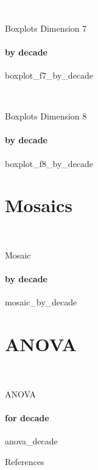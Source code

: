 {\nologo
{}
\begin{frame}[c,plain]{}
    \vspace*{1cm}
    \centering
    \Huge
    \textcolor{white}{Boxplots Dimension 7}
\end{frame}
}

{\nologo
\begin{frame}{Boxplots Dimension 7}
    \framesubtitle{by decade}
    {boxplot_f7_by_decade}
\end{frame}
}

{\nologo
{}
\begin{frame}[c,plain]{}
    \vspace*{1cm}
    \centering
    \Huge
    \textcolor{white}{Boxplots Dimension 8}
\end{frame}
}

{\nologo
\begin{frame}{Boxplots Dimension 8}
    \framesubtitle{by decade}
    {boxplot_f8_by_decade}
\end{frame}
}

\section{Mosaics}

{\nologo
{}
\begin{frame}[c,plain]{}
    \vspace*{1cm}
    \centering
    \Huge
    \textcolor{white}{Mosaics}
\end{frame}
}

{\nologo
\begin{frame}{Mosaic}
    \framesubtitle{by decade}
    {mosaic_by_decade}
\end{frame}
}

\section{ANOVA}

{\nologo
{}
\begin{frame}[c,plain]{}
    \vspace*{1cm}
    \centering
    \Huge
    \textcolor{white}{ANOVA}
\end{frame}
}

{\nologo
\begin{frame}{ANOVA}
    \framesubtitle{for decade}
    {anova_decade}
\end{frame}
}

\appendix

{\nologo
\begin{frame}[allowframebreaks]{References}
    \printbibliography
\end{frame}
}
